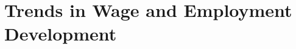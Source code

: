 \documentclass[11pt]{article}
\begin{document}





\section{Trends in Wage and Employment Development}
\end{document}

